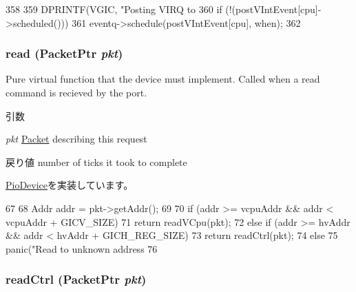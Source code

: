 \begin{DoxyCode}
358 {
359     DPRINTF(VGIC, "Posting VIRQ to %
360     if (!(postVIntEvent[cpu]->scheduled()))
361         eventq->schedule(postVIntEvent[cpu], when);
362 }
\end{DoxyCode}
\hypertarget{classVGic_a613ec7d5e1ec64f8d21fec78ae8e568e}{
\subsubsection[{read}]{ read ({\bf PacketPtr} {\em pkt})}}
\label{classVGic_a613ec7d5e1ec64f8d21fec78ae8e568e}
Pure virtual function that the device must implement. Called when a read command is recieved by the port. 
\begin{DoxyParams}{引数}
\item[{\em pkt}]\hyperlink{classPacket}{Packet} describing this request \end{DoxyParams}
\begin{DoxyReturn}{戻り値}
number of ticks it took to complete 
\end{DoxyReturn}


\hyperlink{classPioDevice_a842312590432036092c422c87a442358}{PioDevice}を実装しています。


\begin{DoxyCode}
67 {
68     Addr addr = pkt->getAddr();
69 
70     if (addr >= vcpuAddr && addr < vcpuAddr + GICV_SIZE)
71         return readVCpu(pkt);
72     else if (addr >= hvAddr && addr < hvAddr + GICH_REG_SIZE)
73         return readCtrl(pkt);
74     else
75         panic("Read to unknown address %
76 }
\end{DoxyCode}
\hypertarget{classVGic_a45a7fc6132e09486475eca0302ab4981}{
\subsubsection[{readCtrl}]{ readCtrl ({\bf PacketPtr} {\em pkt})}}
\label{classVGic_a45a7fc6132e09486475eca0302ab4981}



